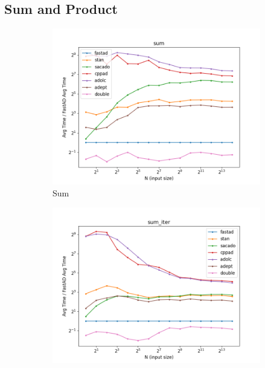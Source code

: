 \subsection{Sum and Product}

\begin{figure}[t]
    \centering
    \begin{subfigure}[b]{0.475\textwidth}
        \centering
        \includegraphics[width=\textwidth]{figs/sum_fig.png}
        \caption{Sum}\label{fig:sum}
    \end{subfigure}
    \hfill
    \begin{subfigure}[b]{0.475\textwidth}
        \centering
        \includegraphics[width=\textwidth]{figs/sum_iter_fig.png}

\end{subfigure}
\end{figure}
